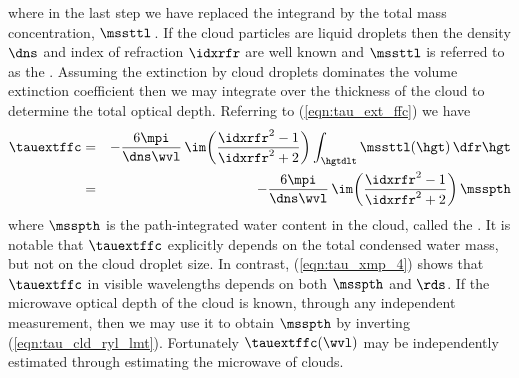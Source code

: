 \documentclass[12pt]{article}
\begin{document}
where in the last step we have replaced the integrand by the total
mass concentration, $\mssttl$\,\kgxmC.  
If the cloud particles are liquid droplets then 
the density $\dns$ and index of refraction $\idxrfr$ are well known
and $\mssttl$ is referred to as the .
Assuming the extinction by cloud droplets dominates the volume
extinction coefficient then we may integrate over the thickness of the
cloud to determine the total optical depth.
Referring to (\ref{eqn:tau_ext_ffc}) we have
\begin{eqnarray} 
\tauextffc
& = & 
-\frac{6\mpi}{\dns \wvl} \, \im \! \left( 
\frac{\idxrfr^{2}-1}{\idxrfr^{2}+2} \right) 
\int_{\hgtdlt} \mssttl(\hgt) \,\dfr\hgt \nonumber \\
& = & 
-\frac{6\mpi}{\dns \wvl} \, \im \! \left( 
\frac{\idxrfr^{2}-1}{\idxrfr^{2}+2} \right) 
\msspth
\label{eqn:tau_cld_ryl_lmt}
\end{eqnarray} 
where $\msspth$ is the path-integrated water content in the cloud,
called the .
It is notable that $\tauextffc$ explicitly depends on the 
total condensed water mass, but not on the cloud droplet size.
In contrast, (\ref{eqn:tau_xmp_4}) shows that $\tauextffc$ in visible 
wavelengths depends on both $\msspth$ and $\rds$.
If the microwave optical depth of the cloud is known, through any
independent measurement, then we may use it to obtain $\msspth$ by
inverting (\ref{eqn:tau_cld_ryl_lmt}).
Fortunately $\tauextffc(\wvl)$ may be independently estimated through
estimating the microwave  of clouds.
\end{document}
